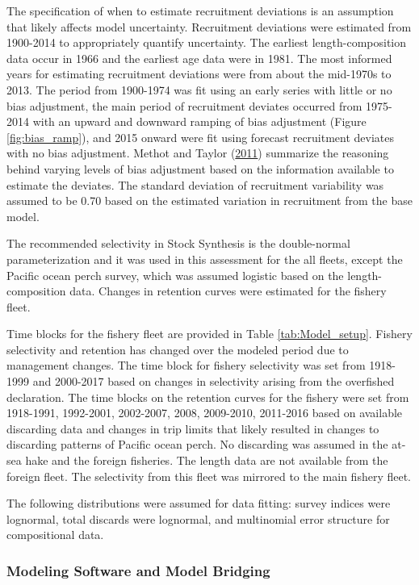 \documentclass[12pt,]{article}
\begin{document}
The specification of when to estimate recruitment deviations is an
assumption that likely affects model uncertainty. Recruitment deviations
were estimated from 1900-2014 to appropriately quantify uncertainty. The
earliest length-composition data occur in 1966 and the earliest age data
were in 1981. The most informed years for estimating recruitment
deviations were from about the mid-1970s to 2013. The period from
1900-1974 was fit using an early series with little or no bias
adjustment, the main period of recruitment deviates occurred from
1975-2014 with an upward and downward ramping of bias adjustment (Figure
\ref{fig:bias_ramp}), and 2015 onward were fit using forecast
recruitment deviates with no bias adjustment. Methot and Taylor
(\protect\hyperlink{ref-methot_adjusting_2011}{2011}) summarize the
reasoning behind varying levels of bias adjustment based on the
information available to estimate the deviates. The standard deviation
of recruitment variability was assumed to be 0.70 based on the estimated
variation in recruitment from the base model.

The recommended selectivity in Stock Synthesis is the double-normal
parameterization and it was used in this assessment for the all fleets,
except the Pacific ocean perch survey, which was assumed logistic based
on the length-composition data. Changes in retention curves were
estimated for the fishery fleet.

Time blocks for the fishery fleet are provided in Table
\ref{tab:Model_setup}. Fishery selectivity and retention has changed
over the modeled period due to management changes. The time block for
fishery selectivity was set from 1918-1999 and 2000-2017 based on
changes in selectivity arising from the overfished declaration. The time
blocks on the retention curves for the fishery were set from 1918-1991,
1992-2001, 2002-2007, 2008, 2009-2010, 2011-2016 based on available
discarding data and changes in trip limits that likely resulted in
changes to discarding patterns of Pacific ocean perch. No discarding was
assumed in the at-sea hake and the foreign fisheries. The length data
are not available from the foreign fleet. The selectivity from this
fleet was mirrored to the main fishery fleet.

The following distributions were assumed for data fitting: survey
indices were lognormal, total discards were lognormal, and multinomial
error structure for compositional data.

\subsubsection{Modeling Software and Model
Bridging}\label{modeling-software-and-model-bridging}
\end{document}
